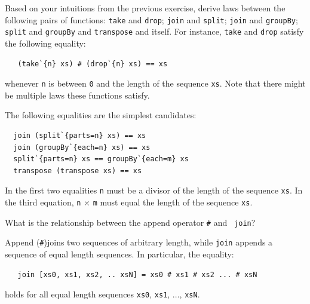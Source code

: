 \begin{Exercise}\label{ex:seq:12}
  Based on your intuitions from the previous exercise, derive laws
  between the following pairs of functions: {\tt take} and {\tt drop};
  {\tt join} and {\tt split}; {\tt join} and {\tt groupBy}; {\tt
    split} and {\tt groupBy} and {\tt transpose} and itself.  For
  instance, {\tt take} and {\tt drop} satisfy the following
  equality:\indTake\indDrop\indJoin\indSplitBy\indGroup\indTranspose
\begin{Verbatim}
   (take`{n} xs) # (drop`{n} xs) == xs
\end{Verbatim}
whenever {\tt n} is between {\tt 0} and the length of the sequence
{\tt xs}. Note that there might be multiple laws these functions
satisfy.
\end{Exercise}
\begin{Answer}
  The following equalities are the simplest
  candidates:\indJoin\indSplitBy\indGroup\indTranspose
\begin{Verbatim}
  join (split`{parts=n} xs) == xs
  join (groupBy`{each=n} xs) == xs
  split`{parts=n} xs == groupBy`{each=m} xs
  transpose (transpose xs) == xs
\end{Verbatim}
In the first two equalities {\tt n} must be a divisor of the length of
the sequence {\tt xs}.  In the third equation, {\tt n} $\times$ {\tt m}
must equal the length of the sequence {\tt xs}.
\end{Answer}

\begin{Exercise}\label{ex:seq:13}
What is the relationship between the append operator {\tt \#} and {\tt
  join}?\indAppend\indJoin
\end{Exercise}
\begin{Answer}
Append ({\tt \#})\indAppend\indJoin joins two sequences of arbitrary
length, while {\tt join} appends a sequence of equal length
sequences. In particular, the equality:
\begin{Verbatim}
   join [xs0, xs1, xs2, .. xsN] = xs0 # xs1 # xs2 ... # xsN
\end{Verbatim}
holds for all equal length sequences {\tt xs0}, {\tt xs1}, $\ldots$,
{\tt xsN}.
\end{Answer}

